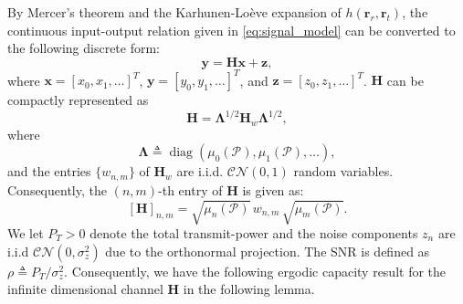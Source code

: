 \documentclass[lettersize,journal]{IEEEtran}
\theoremstyle{plain}
\begin{document}
By Mercer's theorem and the Karhunen-Lo\`eve expansion of $h(\mathbf{r}_r, \mathbf{r}_t)$, the continuous input-output relation given in \eqref{eq:signal_model} can be converted to the following discrete form:
\begin{equation}
	\mathbf{y}
	=
	\mathbf{H}\mathbf{x}
	+
	\mathbf{z},
	\label{eq:equivalent_channel}
\end{equation}
where $\mathbf{x}=[x_0,x_1,\ldots]^T$,
$\mathbf{y}=[y_0,y_1,\ldots]^T$, and
$\mathbf{z}=[z_0,z_1,\ldots]^T$. $\mathbf{H}$ can be compactly represented as
\begin{equation}
	\mathbf{H}
	=
	\boldsymbol{\Lambda}^{1/2}
	\mathbf{H}_w
	\boldsymbol{\Lambda}^{1/2},
	\label{eq:H_factored}
\end{equation}
where
\begin{equation}
	\boldsymbol{\Lambda}
	\triangleq
	\operatorname{diag}
	\left(
	\mu_0(\mathcal{P}),
	\mu_1(\mathcal{P}),
	\ldots
	\right),
	\label{eq:Lambda_definition}
\end{equation}
and the entries $\{w_{n,m}\}$ of $\mathbf{H}_w$ are i.i.d. $\mathcal{CN}(0, 1)$ random variables. Consequently, the $(n,m)$-th entry of $\mathbf{H}$ is given as:
$$
	[\mathbf{H}]_{n,m}
	=
	\sqrt{\mu_n(\mathcal{P})}\,
	w_{n,m}\,
	\sqrt{\mu_m(\mathcal{P})}.
	\label{eq:H_element}
$$
We let $P_T>0$ denote the total transmit-power and the noise components $z_n$ are i.i.d $\mathcal{CN}(0, \sigma_z^2)$ due to the orthonormal projection. The SNR is defined as $\rho\triangleq P_T/\sigma_z^2$. Consequently, we have the following ergodic capacity result for the infinite dimensional channel $\mathbf{H}$ in the following lemma.
\end{document}
